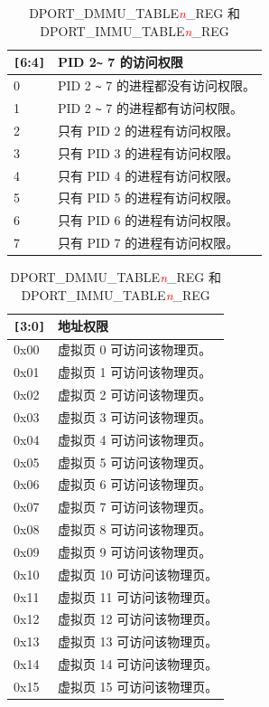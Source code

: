\begin{table}[H]
    \centering
    \caption{DPORT\_DMMU\_TABLE\textcolor{red}{\it{n}}\_REG 和 DPORT\_IMMU\_TABLE\textcolor{red}{\it{n}}\_REG}
    \label{table:DPORT_DMMU_IMMU_TABLEn_REG}
    \begin{tabular}[t]{|p{1cm}|p{6cm}|}
     
        \hline
        \rowcolor{lightgray}
        \verb+[+6:4\verb+]+ & PID 2\verb+~+ 7 的访问权限\\
        \hline
        0 & PID 2 \verb+~+ 7 的进程都没有访问权限。 \\
        \hline
        1 & PID 2 \verb+~+ 7 的进程都有访问权限。 \\
        \hline
        2 & 只有 PID 2 的进程有访问权限。 \\
        \hline
        3 & 只有 PID 3 的进程有访问权限。 \\
        \hline
        4 & 只有 PID 4 的进程有访问权限。 \\
        \hline
        5 & 只有 PID 5 的进程有访问权限。 \\
        \hline
        6 & 只有 PID 6 的进程有访问权限。 \\
        \hline
        7 & 只有 PID 7 的进程有访问权限。 \\
        \hline
    \end{tabular}
    \begin{tabular}[t]{|p{1cm}|p{5cm}|}
        \hline
        \rowcolor{lightgray}
        \verb+[+3:0\verb+]+ & 地址权限 \\
        \hline
        0x00 & 虚拟页 0 可访问该物理页。 \\
        \hline
        0x01 & 虚拟页 1 可访问该物理页。 \\
        \hline
        0x02 & 虚拟页 2 可访问该物理页。 \\
        \hline
        0x03 & 虚拟页 3 可访问该物理页。\\
        \hline
        0x04 & 虚拟页 4 可访问该物理页。 \\
        \hline
        0x05 & 虚拟页 5 可访问该物理页。 \\
        \hline
        0x06 & 虚拟页 6 可访问该物理页。 \\
        \hline
        0x07 & 虚拟页 7 可访问该物理页。\\
        \hline
        0x08 & 虚拟页 8 可访问该物理页。\\
        \hline
        0x09 & 虚拟页 9 可访问该物理页。 \\
        \hline
        0x10 & 虚拟页 10 可访问该物理页。 \\
        \hline
        0x11 & 虚拟页 11 可访问该物理页。\\
        \hline
        0x12 & 虚拟页 12 可访问该物理页。 \\
        \hline
        0x13 & 虚拟页 13 可访问该物理页。 \\
        \hline
        0x14 & 虚拟页 14 可访问该物理页。 \\
        \hline
        0x15 & 虚拟页 15 可访问该物理页。 \\
        \hline
    \end{tabular}
\end{table}
